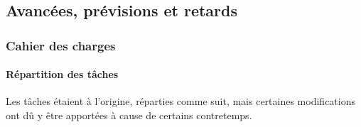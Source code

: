 \subsection{Avancées, prévisions et retards}

    \vspace{0.5cm}
    \subsubsection{Cahier des charges}
    \vspace{0.5cm}

        \paragraph{Répartition des tâches}
            Les tâches étaient à l'origine, réparties comme suit, mais certaines modifications ont dû y être apportées 
            à cause de certains contretemps.

